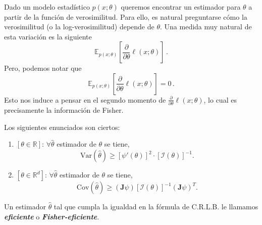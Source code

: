 \begin{observation}
Dado un modelo estad\'istico $p(x;\theta)$ queremos encontrar un estimador para $\theta$ a partir de la funci\'on de verosimilitud. 
Para ello, es natural preguntarse c\'omo la verosimilitud (o la log-verosimilitud) depende de $\theta$.
Una medida muy natural de esta variaci\'on es la siguiente 
\begin{equation*}
    \mathbb{E}_{p(x;\theta)}\left[\frac{\partial}{\partial \theta}\ell(x;\theta)\right]\,.
\end{equation*}
Pero, podemos notar que 
\begin{equation*}
    \mathbb{E}_{p(x;\theta)}\left[\frac{\partial}{\partial \theta}\ell(x;\theta)\right]=0\,.
\end{equation*}
Esto nos induce a pensar en el segundo momento de $\frac{\partial}{\partial\theta}\ell(x;\theta)$, lo cual 
es precisamente la informaci\'on de Fisher. 
\end{observation}

\begin{theorem}
Los siguientes enunciados son ciertos:
\begin{enumerate}[label=(\alph*)]
    \item $[\theta\in\mathbb{R}]$: $\forall\hat{\theta}$ estimador de $\theta$ se tiene,
    \begin{equation*}
        \text{Var}\left(\hat{\theta}\right)\geq\left[\psi'(\theta)\right]^2\cdot\left[\mathcal{I}(\theta)\right]^{-1}.
    \end{equation*}
    \item $[\theta\in\mathbb{R}^d]$: $\forall\hat{\theta}$ estimador de $\theta$ se tiene,
    \begin{equation*}
        \text{Cov}\left(\hat{\theta}\right)\geq\left(\mathbf{J}\psi\right)\left[\mathcal{I}(\theta)\right]^{-1}\left(\mathbf{J}\psi\right)^T.
    \end{equation*}
\end{enumerate}
\end{theorem}

\begin{definition}
Un estimador $\hat{\theta}$ tal que cumpla la igualdad en la f\'ormula de C.R.L.B. le llamamos 
\textit{\textbf{eficiente}} o \textit{\textbf{Fisher-eficiente}}.    
\end{definition}

